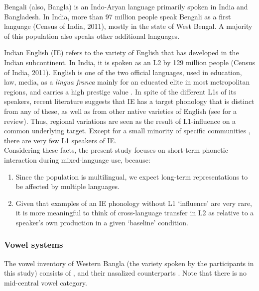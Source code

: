\documentclass[charis,linguex]{glossa}
\newcommand{\nt}[1]{\textipa{[#1]}} %
\begin{document}
Bengali (also, Bangla) is an Indo-Aryan language primarily spoken in India and Bangladesh. In India, more than 97 million people speak Bengali as a first language (Census of India, 2011), mostly in the state of West Bengal. A majority of this population also speaks other additional languages.

Indian English (IE) refers to the variety of English that has developed in the Indian subcontinent. In India, it is spoken as an L2 by 129 million people (Census of India, 2011).  English is one of the two official languages, used in education, law, media, as a \emph{lingua franca} mainly for an educated elite in most metropolitan regions, and carries a high prestige value \citep{tollefson2014language}.
In spite of the different L1s of its speakers, recent literature suggests that IE has a target phonology that is distinct from any of these, as well as from other native varieties of English (see \cite{sirsa2013effects} for a review). Thus, regional variations are seen as the result of L1-influence on a common underlying target. 
Except for a small minority of specific communities \citep{pandey201517}, there are very few L1 speakers of IE.\\

Considering these facts, the present study focuses on short-term phonetic interaction during mixed-language use, because:
\begin{enumerate}[label=(\roman*)]
	\item Since the population is multilingual, we expect long-term representations to be affected by multiple languages. 
	\item Given that examples of an IE phonology without L1 `influence' are very rare, it is more meaningful to think of cross-language transfer in L2 as relative to a speaker's own production in a given `baseline' condition.
\end{enumerate}


\subsubsection{Vowel systems} \label{vowel systems}
The vowel inventory of Western Bangla (the variety spoken by the participants in this study) consists of \nt{i, e, \ae, a, O, o, u}, and their nasalized counterparts \citep{garry2001facts}. Note that there is no mid-central vowel category. 
\end{document}
